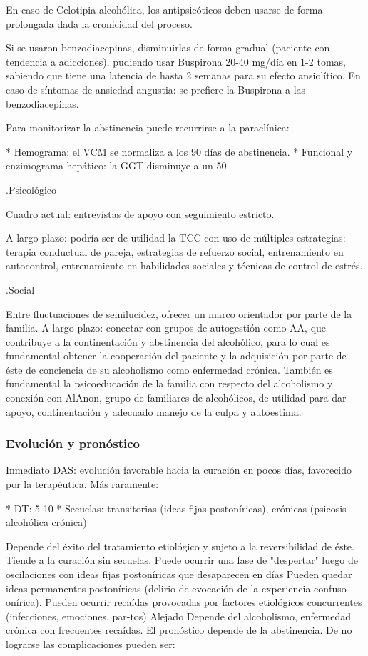 \documentclass[encares.tex]{subfiles}
\begin{document}
En caso de Celotipia alcohólica, los antipsicóticos deben usarse de forma prolongada dada la cronicidad del proceso.

Si se usaron benzodiacepinas, disminuirlas de forma gradual (paciente con tendencia a adicciones), pudiendo usar Buspirona 20-40 mg/día en 1-2 tomas, sabiendo que tiene una latencia de hasta 2 semanas para su efecto ansiolítico. En caso de síntomas de ansiedad-angustia: se prefiere la Buspirona a las benzodiacepinas.

Para monitorizar la abstinencia puede recurrirse a la paraclínica:

* Hemograma: el VCM se normaliza a los 90 días de abstinencia.
* Funcional y enzimograma hepático: la GGT disminuye a un 50%

.Psicológico

Cuadro actual: entrevistas de apoyo con seguimiento estricto.

A largo plazo: podría ser de utilidad la TCC con uso de múltiples estrategias: terapia conductual de pareja, estrategias de refuerzo social, entrenamiento en autocontrol, entrenamiento en habilidades sociales y técnicas de control de estrés.

.Social

Entre fluctuaciones de semilucidez, ofrecer un marco orientador por parte de la familia. A largo plazo: conectar con grupos de autogestión como AA, que contribuye a la continentación y abstinencia del alcohólico, para lo cual es fundamental obtener la cooperación del paciente y la adquisición por parte de éste de conciencia de su alcoholismo como enfermedad crónica. También es fundamental la psicoeducación de la familia con respecto del alcoholismo y conexión con AlAnon, grupo de familiares de alcohólicos, de utilidad para dar apoyo, continentación y adecuado manejo de la culpa y autoestima.

\subsubsection*{Evolución y pronóstico}

Inmediato DAS: evolución favorable hacia la curación en pocos días, favorecido por la terapéutica. Más raramente:

* DT: 5-10%
* Secuelas: transitorias (ideas fijas postoníricas), crónicas (psicosis alcohólica crónica)

Depende del éxito del tratamiento etiológico y sujeto a la reversibilidad de éste. Tiende a la curación sin secuelas. Puede ocurrir una fase de "despertar" luego de oscilaciones con ideas fijas postoníricas que desaparecen en días Pueden quedar ideas permanentes postoníricas (delirio de evocación de la experiencia confuso-onírica). Pueden ocurrir recaídas provocadas por factores etiológicos concurrentes (infecciones, emociones, par-tos) Alejado Depende del alcoholismo, enfermedad crónica con frecuentes recaídas. El pronóstico depende de la abstinencia. De no lograrse las complicaciones pueden ser:
\end{document}
